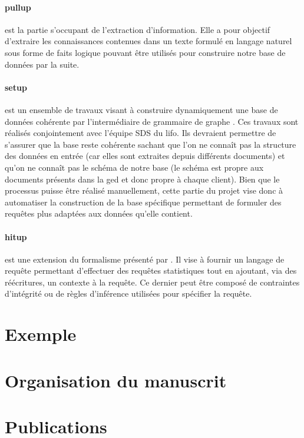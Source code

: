 \paragraph{\gls{pullup}} est la partie s'occupant de l'extraction d'information.
Elle a pour objectif d'extraire les connaissances contenues dans un texte formulé en langage naturel sous forme de faits logique pouvant être utilisés pour construire notre base de données par la suite.

\paragraph{\gls{setup}} est un ensemble de travaux visant à construire dynamiquement une base de données cohérente par l'intermédiaire de grammaire de graphe \cite{chabin_using_2019}.
Ces travaux sont réalisés conjointement avec l'équipe SDS du \gls{lifo}.
Ils devraient permettre de s'assurer que la base reste cohérente sachant que l'on ne connaît pas la structure des données en entrée (car elles sont extraites depuis différents documents) et qu'on ne connaît pas le schéma de notre base (le schéma est propre aux documents présents dans la \gls{ged} et donc propre à chaque client).
Bien que le processus puisse être réalisé manuellement, cette partie du projet vise donc à automatiser la construction de la base spécifique permettant de formuler des requêtes plus adaptées aux données qu'elle contient.

\paragraph{\gls{hitup}} est une extension du formalisme présenté par \cite{chabin_context-driven_2018}.
Il vise à fournir un langage de requête permettant d'effectuer des requêtes statistiques tout en ajoutant, via des réécritures, un contexte à la requête.
Ce dernier peut être composé de contraintes d'intégrité ou de règles d'inférence utilisées pour spécifier la requête.

\section{Exemple}


\section{Organisation du manuscrit}

\section{Publications}
